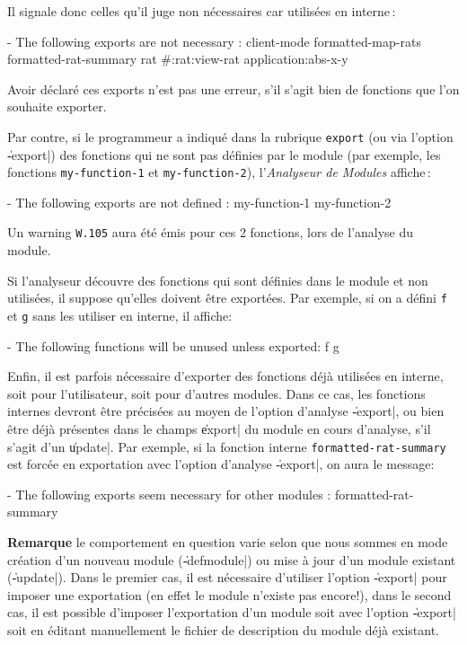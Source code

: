 Il signale donc celles qu'il juge non n\'{e}cessaires car utilis\'{e}es en
interne\,:

\begin{Longcode*}
- The following exports are not necessary :
 client-mode
 formatted-map-rats
 formatted-rat-summary
 rat
 #:rat:view-rat
 {application}:abs-x-y
\end{Longcode*}

Avoir d\'{e}clar\'{e} ces exports n'est pas une erreur, s'il s'agit bien de
fonctions que l'on souhaite exporter.

Par contre, si le programmeur a indiqu\'{e} dans la rubrique {\tt export}
(ou via l'option \|-export|)
des fonctions qui ne sont pas d\'{e}finies par le module (par exemple,
les fonctions {\tt my-function-1} et {\tt my-function-2}), l'{\it Analyseur
de Modules} affiche\,:

\begin{Longcode*}
- The following exports are not defined :
 my-function-1
 my-function-2
\end{Longcode*}

Un warning {\tt W.105} aura \'{e}t\'{e} \'{e}mis pour ces 2 fonctions, lors de
l'analyse du module. 

Si l'analyseur d\'{e}couvre des fonctions qui sont d\'{e}finies dans le
module et non utilis\'{e}es, il suppose qu'elles doivent \^{e}tre
export\'{e}es.  Par exemple, si on a d\'{e}fini {\tt f} et {\tt g} sans les
utiliser en interne, il affiche:

\begin{Longcode*}
- The following functions will be unused unless exported:
 f
 g
\end{Longcode*}

Enfin, il est parfois n\'{e}cessaire d'exporter des fonctions d\'{e}j\`{a}
utilis\'{e}es en interne, soit pour l'utilisateur, soit pour d'autres
modules. Dans ce cas, les fonctions internes devront \^{e}tre pr\'{e}cis\'{e}es
au moyen de l'option d'analyse \|-export|, ou bien \^{e}tre d\'{e}j\`{a}
pr\'{e}sentes dans le champs \|export| du module en cours d'analyse, s'il
s'agit d'un \|update|. Par exemple, si la fonction
interne {\tt formatted-rat-summary} est forc\'{e}e en exportation avec
l'option d'analyse \|-export|, on aura le message:

\begin{Longcode*}
- The following exports seem necessary for other modules :
     formatted-rat-summary
\end{Longcode*}

\begin{Side}{\bf Remarque}
le comportement en question varie selon que nous sommes en
mode cr\'{e}ation d'un nouveau module 
(\|-defmodule|) ou mise \`{a} jour d'un module existant (\|-update|).
Dans le premier cas, il est n\'{e}cessaire d'utiliser l'option \|-export|
pour imposer une exportation (en effet le module n'existe pas
encore!),
dans le second cas, il est possible d'imposer l'exportation d'un
module soit avec l'option \|-export| soit en \'{e}ditant manuellement le
fichier de description du module d\'{e}j\`{a} existant.
\end{Side}

